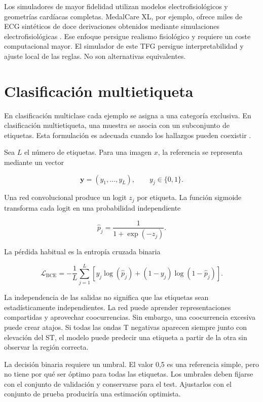 Los simuladores de mayor fidelidad utilizan modelos electrofisiológicos y geometrías cardíacas completas. MedalCare XL, por ejemplo, ofrece miles de ECG sintéticos de doce derivaciones obtenidos mediante simulaciones electrofisiológicas \cite{gillette2023}. Ese enfoque persigue realismo fisiológico y requiere un coste computacional mayor. El simulador de este TFG persigue interpretabilidad y ajuste local de las reglas. No son alternativas equivalentes.

\section{Clasificación multietiqueta}

En clasificación multiclase cada ejemplo se asigna a una categoría exclusiva. En clasificación multietiqueta, una muestra se asocia con un subconjunto de etiquetas. Esta formulación es adecuada cuando los hallazgos pueden coexistir \cite{tsoumakas2007}.

Sea \(L\) el número de etiquetas. Para una imagen \(x\), la referencia se representa mediante un vector

\begin{equation}
\mathbf{y} = (y_1,\ldots,y_L), \qquad y_j \in \{0,1\}.
\end{equation}

Una red convolucional produce un logit \(z_j\) por etiqueta. La función sigmoide transforma cada logit en una probabilidad independiente

\begin{equation}
\hat{p}_j = \frac{1}{1+\exp(-z_j)}.
\end{equation}

La pérdida habitual es la entropía cruzada binaria

\begin{equation}
\mathcal{L}_{\mathrm{BCE}} =
-\frac{1}{L}
\sum_{j=1}^{L}
\left[
y_j \log(\hat{p}_j)
+
(1-y_j)\log(1-\hat{p}_j)
\right].
\label{eq:bce}
\end{equation}

La independencia de las salidas no significa que las etiquetas sean estadísticamente independientes. La red puede aprender representaciones compartidas y aprovechar coocurrencias. Sin embargo, una coocurrencia excesiva puede crear atajos. Si todas las ondas T negativas aparecen siempre junto con elevación del ST, el modelo puede predecir una etiqueta a partir de la otra sin observar la región correcta.

La decisión binaria requiere un umbral. El valor 0,5 es una referencia simple, pero no tiene por qué ser óptimo para todas las etiquetas. Los umbrales deben fijarse con el conjunto de validación y conservarse para el test. Ajustarlos con el conjunto de prueba produciría una estimación optimista.

